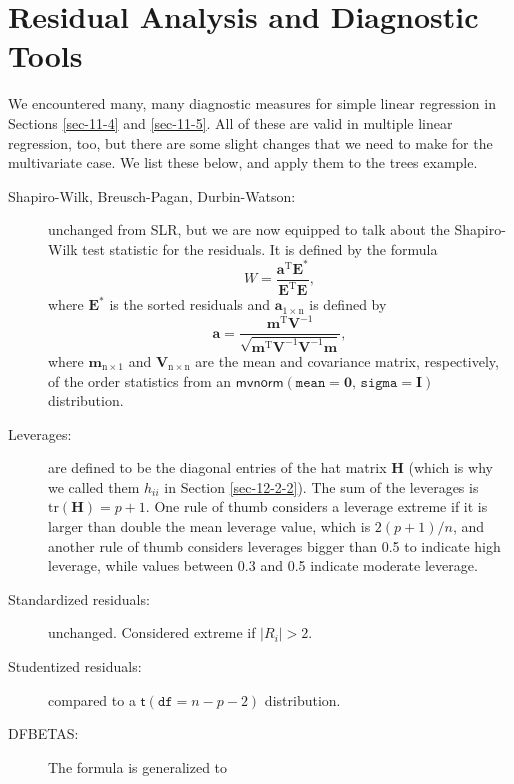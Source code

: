 \documentclass[captions=tableheading]{scrbook}
\begin{document}
\section{Residual Analysis and Diagnostic Tools}
\label{sec-12-8}
\label{sec-Residual-Analysis-MLR}


We encountered many, many diagnostic measures for simple linear regression in Sections \ref{sec-11-4} and \ref{sec-11-5}. All of these are valid in multiple linear regression, too, but there are some slight changes that we need to make for the multivariate case. We list these below, and apply them to the trees example.  

\begin{description}
\item[Shapiro-Wilk, Breusch-Pagan, Durbin-Watson:] unchanged from SLR, but we are now equipped to talk about the Shapiro-Wilk test statistic for the residuals. It is defined by the formula 
   \begin{equation}
   W=\frac{\mathbf{a}^{\mathrm{T}}\mathbf{E}^{\ast}}{\mathbf{E}^{\mathrm{T}}\mathbf{E}},
   \end{equation}
   where \(\mathbf{E}^{\ast}\) is the sorted residuals and \(\mathbf{a}_{1\times\mathrm{n}}\) is defined by 
   \begin{equation}
   \mathbf{a}=\frac{\mathbf{m}^{\mathrm{T}}\mathbf{V}^{-1}}{\sqrt{\mathbf{m}^{\mathrm{T}}\mathbf{V}^{-1}\mathbf{V}^{-1}\mathbf{m}}},
   \end{equation}
   where \(\mathbf{m}_{\mathrm{n}\times1}\) and \(\mathbf{V}_{\mathrm{n}\times\mathrm{n}}\) are the mean and covariance matrix, respectively, of the order statistics from an \(\mathsf{mvnorm}\left(\mathtt{mean}=\mathbf{0},\,\mathtt{sigma}=\mathbf{I}\right)\) distribution.
\item[Leverages:] are defined to be the diagonal entries of the hat matrix \(\mathbf{H}\) (which is why we called them \(h_{ii}\) in Section \ref{sec-12-2-2}). The sum of the leverages is \(\mbox{tr}(\mathbf{H})=p+1\). One rule of thumb considers a leverage extreme if it is larger than double the mean leverage value, which is \(2(p+1)/n\), and another rule of thumb considers leverages bigger than 0.5 to indicate high leverage, while values between 0.3 and 0.5 indicate moderate leverage.
\item[Standardized residuals:] unchanged. Considered extreme if \(|R_{i}|>2\).
\item[Studentized residuals:] compared to a \(\mathsf{t}(\mathtt{df}=n-p-2)\) distribution.
\item[DFBETAS:] The formula is generalized to

\end{description}
\end{document}
